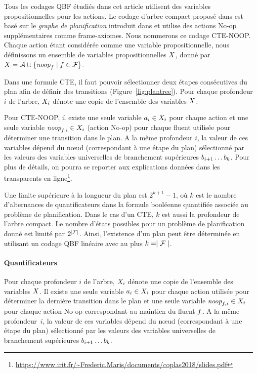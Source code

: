 
Tous les codages QBF étudiés dans cet article utilisent des variables propositionnelles pour les actions. Le codage d'arbre compact proposé dans \cite{DBLP:conf/ecai/CashmoreFG12} est basé sur le \textit{graphe de planification} introduit dans \cite{BF97} et utilise des actions No-op supplémentaires comme frame-axiomes. Nous nommerons ce codage CTE-NOOP.
Chaque action étant considérée comme une variable propositionnelle, nous définissons un ensemble de variables propositionnelles $X$, donné par $X = \mathcal{A} \cup \{\textit{noop}_{f}\mid f\in\mathcal{F}\}$.

Dans une formule CTE, il faut pouvoir sélectionner deux étapes consécutives du plan afin de définir des transitions (Figure~\ref{fig:plantree}). Pour chaque profondeur $i$ de l'arbre, $X_i$ dénote une copie de l'ensemble des variables $X$.

Pour CTE-NOOP, il existe une seule variable $a_{i}\in X_{i}$ pour chaque action et une seule variable $\textit{noop}_{f,i}\in X_{i}$ (action No-op) pour chaque fluent utilisée pour déterminer une transition dans le plan. A la même profondeur $i$, la valeur de ces variables dépend du n\oe ud (correspondant à une étape du plan) sélectionné par les valeurs des variables universelles de branchement supérieures $b_{i+1}\ldots b_{k}$. Pour plus de détails, on pourra se reporter aux explications données dans les transparents en ligne\footnote{\url{https://www.irit.fr/~Frederic.Maris/documents/coplas2018/slides.pdf}}.

Une limite supérieure à la longueur du plan est $2^{k+1}-1$, où $k$ est le nombre d'alternances de quantificateurs dans la formule booléenne quantifiée associée au problème de planification. Dans le cas d'un CTE, $k$ est aussi la profondeur de l'arbre compact. Le nombre d'états possibles pour un problème de planification donné est limité par $2^{\mid \mathcal{F} \mid}$. Ainsi, l'existence d'un plan peut être déterminée en utilisant un codage QBF linéaire avec au plus $k=\mid \mathcal{F} \mid$.



\paragraph*{Quantificateurs}

Pour chaque profondeur $i$ de l'arbre, $X_i$ dénote une copie de l'ensemble des variables $X$. Il existe une seule variable $a_{i}\in X_{i}$ pour chaque action utilisée pour déterminer la dernière transition dans le plan et une seule variable $\textit{noop}_{f,i}\in X_{i}$ pour chaque action No-op correspondant au maintien du fluent $f$. A la même profondeur~$i$, la valeur de ces variables dépend du n\oe ud (correspondant à une étape du plan) sélectionné par les valeurs des variables universelles de branchement supérieures $b_{i+1}\ldots b_{k}$.

